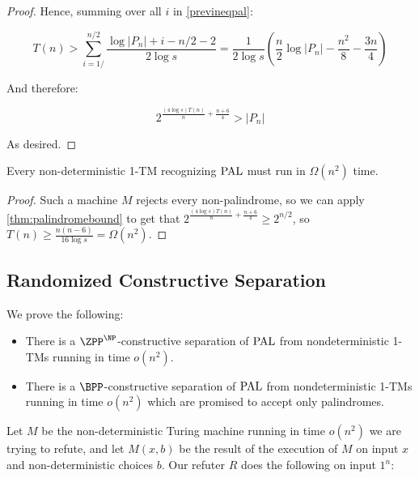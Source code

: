 \begin{proof}
Hence, summing over all $i$ in \eqref{previneqpal}:

$$
T(n) > \sum_{i=1/}^{n/2} \frac{\log |P_n| + i - n/2 - 2}{2 \log s} = \frac{1}{2\log s} \left( \frac{n}{2} \log |P_n| - \frac{n^2}{8} -\frac{3n}{4} \right) 
$$



And therefore:

$$
2^{\frac{(4 \log s) T(n)}{n} + \frac{n+6}{4}} > |P_n|
$$

As desired. 

    
\end{proof}

\begin{corollary}
Every non-deterministic 1-TM recognizing $\mathrm{PAL}$ must run in $\Omega(n^2)$ time.
\end{corollary}
\begin{proof}
Such a machine $M$ rejects every non-palindrome, so we can apply \cref{thm:palindromebound} to get that
$2^{\frac{(4 \log s) T(n)}{n} + \frac{n+6}{4}} \geq 2^{n/2}$, so $T(n) \geq \frac{n(n-6)}{16 \log s} = \Omega(n^2)$.
\end{proof}



\subsection{Randomized Constructive Separation}

We prove the following: 

\begin{theorem}
    \begin{itemize}
    \item There is a $\ZPP^\NP$-constructive separation of $\mathrm{PAL}$ from nondeterministic 1-TMs 
    running in time $o(n^2)$. 
    \item There is a $\BPP$-constructive separation of $\mathrm{PAL}$ from nondeterministic 1-TMs 
    running in time $o(n^2)$ which
    are promised to accept only palindromes. 
    \end{itemize}
\end{theorem}

Let $M$ be the non-deterministic Turing machine running in time $o(n^2)$ we are trying to refute, 
and let $M(x, b)$ be the result of the execution of $M$ on input $x$ and non-deterministic choices $b$.
Our refuter $R$ does the following on input $1^n$:

